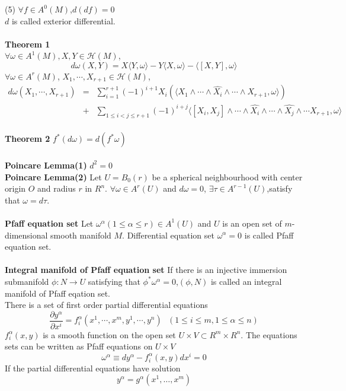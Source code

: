 \documentclass{article}
\begin{document}
(5) $\forall f \in A^0(M)$,$d(df)=0$\\
$d$ is called exterior differential.\\ \\
\textbf{Theorem 1}\\
$\forall \omega \in A^1(M),X,Y \in \mathcal{H}(M)$,
\[d\omega(X,Y) = X \langle Y,\omega \rangle -Y \langle X,\omega \rangle -\langle [X,Y],\omega \rangle \] 
$\forall \omega \in A^r(M)$, $X_1,\cdots,X_{r+1} \in \mathcal{H}(M)$,
\begin{eqnarray}
d\omega(X_1,\cdots,X_{r+1}) &=& \sum_{i=1}^{r+1}(-1)^{i+1} X_{i}(\langle X_1 \wedge \cdots \wedge \hat{X_i} \wedge \cdots \wedge X_{r+1},\omega \rangle) \nonumber \\
&+& \sum_{1 \leq i < j \leq r+1}(-1)^{i+j} \langle [X_i,X_j] \wedge \cdots \wedge \hat{X_i} \wedge \cdots \wedge \hat{X_j} \wedge \cdots X_{r+1},\omega \rangle
\end{eqnarray}\\
\textbf{Theorem 2} $f^{*}(d\omega) = d(f^* \omega)$\\ \\
\textbf{Poincare Lemma(1)} $d^2=0$ \\
\textbf{Poincare Lemma(2)} Let $U=B_0(r)$ be a spherical neighbourhood with center origin $O$ and radius $r$ in $R^n$. $\forall \omega \in A^r(U)$ and $d\omega =0$, $\exists \tau \in A^{r-1}(U)$,satisfy that $\omega = d\tau$.\\ \\
\textbf{Pfaff equation set} Let $\omega^{\alpha}(1 \leq \alpha \leq r) \in A^1(U)$ and $U$ is an open set of $m$-dimensional smooth manifold $M$. Differential equation set $\omega^{\alpha} = 0$ is called Pfaff equation set.\\ \\
\textbf{Integral manifold of Pfaff equation set} If there is an injective immersion submanifold $\phi:N \to U$ satisfying that $\phi^{*} \omega^{\alpha} = 0$,$(\phi,N)$ is called an integral manifold of Pfaff eqation set.\\
There is a set of first order partial differential equations
\[\frac{\partial y^{\alpha}}{\partial x^i} = f^{\alpha}_{i}(x^1,\cdots,x^{m},y^1,\cdots,y^{n}) \ \ \ (1 \leq i \leq m,1 \leq \alpha \leq n)\]
$f^{\alpha}_{i}(x,y)$ is a smooth function on the open set $U \times V \subset R^m \times R^n$. The equations sets can be written as Pfaff equations on $U \times V$
\[\omega^{\alpha} \equiv dy^{\alpha} - f^{\alpha}_{i}(x,y)dx^i = 0\]
If the partial differential equations have solution
\[y^{\alpha} = g^{\alpha}(x^1,\ldots,x^m)\]
\end{document}
